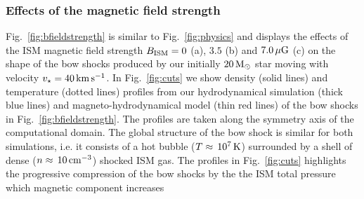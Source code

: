 \documentclass[useAMS,usenatbib]{mn2e}
\begin{document}
\subsubsection{Effects of the magnetic field strength}
\label{sect:}


Fig.~\ref{fig:bfieldstrength} is similar to Fig.~\ref{fig:physics} and displays
the effects of the ISM magnetic field strength $B_{\rm ISM}=0$ (a), $3.5$ (b)
and $7.0\, \rm \mu G$ (c) on the shape of the bow shocks produced by our
initially $20\, \rm M_{\odot}$ star moving with velocity $v_{\star}=40\, \rm
km\, \rm s^{-1}$. In Fig.~\ref{fig:cuts} we show density (solid lines) and
temperature (dotted lines) profiles from our hydrodynamical simulation (thick
blue lines) and magneto-hydrodynamical model (thin red lines) of the bow shocks
in Fig.~\ref{fig:bfieldstrength}. The profiles are taken along the symmetry axis
of the computational domain. The global structure of the bow shock is similar
for both simulations, i.e. it consists of a hot bubble ($T\approx\, 10^{7}\, \rm
K$) surrounded by a shell of dense ($n\approx\, 10\, \rm cm^{-3}$) shocked ISM
gas. The profiles in Fig.~\ref{fig:cuts} highlights the progressive compression 
of the bow shocks by the the ISM total pressure which magnetic component increases 
\end{document}
